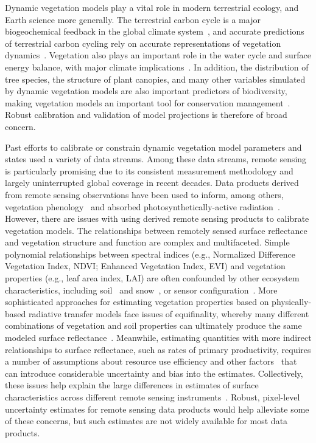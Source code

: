 \introduction

Dynamic vegetation models play a vital role in modern terrestrial ecology, and Earth science more generally.
The terrestrial carbon cycle is a major biogeochemical feedback in the global climate system~\citep{heinze_2019_esd_reviews}, and accurate predictions of terrestrial carbon cycling rely on accurate representations of vegetation dynamics~\citep{pacala_1995_details_that_matter}.
Vegetation also plays an important role in the water cycle and surface energy balance, with major climate implications~\citep{bonan2008forests}.
In addition, the distribution of tree species, the structure of plant canopies, and many other variables simulated by dynamic vegetation models are also important predictors of biodiversity, making vegetation models an important tool for conservation management~\citep{mcmahon2011improving}.
Robust calibration and validation of model projections is therefore of broad concern.

Past efforts to calibrate or constrain dynamic vegetation model parameters and states used a variety of data streams.
Among these data streams, remote sensing is particularly promising due to its consistent measurement methodology and largely uninterrupted global coverage in recent decades.
Data products derived from remote sensing observations have been used to inform, among others,
vegetation phenology~\citep{knorr2010carbon, viskari2015modeldata}
and absorbed photosynthetically-active radiation~\citep{peylin2016new, schurmann2016constraining, zobitz_2014_joint}.
However, there are issues with using derived remote sensing products to calibrate vegetation models.
The relationships between remotely sensed surface reflectance and vegetation structure and function are complex and multifaceted.
Simple polynomial relationships between spectral indices (e.g., Normalized Difference Vegetation Index, NDVI; Enhanced Vegetation Index, EVI) and vegetation properties (e.g., leaf area index, LAI) are often confounded by other ecosystem characteristics, including soil~\citep{myneni1994relationship} and snow~\citep{zhang2020evaluating}, or sensor configuration~\citep{fensholt2004evaluation}.
More sophisticated approaches for estimating vegetation properties based on physically-based radiative transfer models face issues of equifinality, whereby many different combinations of vegetation and soil properties can ultimately produce the same modeled surface reflectance~\citep{combal2003retrieval, lewis2007spectral}.
Meanwhile, estimating quantities with more indirect relationships to surface reflectance, such as rates of primary productivity, requires a number of assumptions about resource use efficiency and other factors~\citep{running2004continuous} that can introduce considerable uncertainty and bias into the estimates.
Collectively, these issues help explain the large differences in estimates of surface characteristics across different remote sensing instruments~\citep{liu_2018_satellite}.
Robust, pixel-level uncertainty estimates for remote sensing data products would help alleviate some of these concerns, but such estimates are not widely available for most data products.


